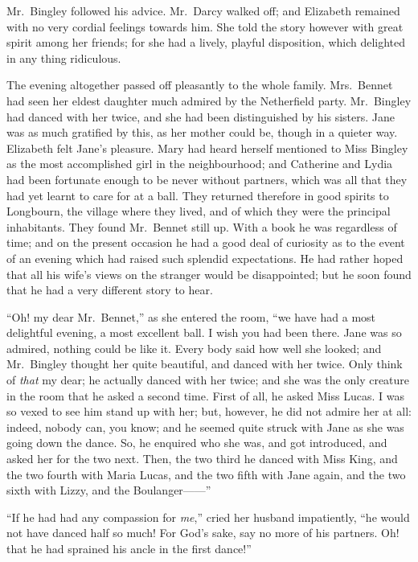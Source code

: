Mr.\ Bingley followed his advice. Mr.\ Darcy walked off;
and Elizabeth remained with no very cordial feelings
towards him. She told the story however with great
spirit among her friends; for she had a lively, playful
disposition, which delighted in any thing ridiculous.

The evening altogether passed off pleasantly to the
whole family. Mrs.\ Bennet had seen her eldest daughter
much admired by the Netherfield party. Mr.\ Bingley had
danced with her twice, and she had been distinguished
by his sisters. Jane was as much gratified by this, as
her mother could be, though in a quieter way. Elizabeth
felt Jane’s pleasure. Mary had heard herself mentioned
to Miss Bingley as the most accomplished girl in the
neighbourhood; and Catherine and Lydia had been
fortunate enough to be never without partners, which
was all that they had yet learnt to care for at a ball.
They returned therefore in good spirits to Longbourn, the
village where they lived, and of which they were the
principal inhabitants. They found Mr.\ Bennet still up.
With a book he was regardless of time; and on the present
occasion he had a good deal of curiosity as to the event
of an evening which had raised such splendid expectations.
He had rather hoped that all his wife’s views on the
stranger would be disappointed; but he soon found that
he had a very different story to hear.

“Oh! my dear Mr.\ Bennet,” as she entered the room,
“we have had a most delightful evening, a most excellent
ball. I wish you had been there. Jane was so admired,
nothing could be like it. Every body said how well she
looked; and Mr.\ Bingley thought her quite beautiful,
and danced with her twice. Only think of \textit{that} my dear;
he actually danced with her twice; and she was the only
creature in the room that he asked a second time. First
of all, he asked Miss Lucas. I was so vexed to see him
stand up with her; but, however, he did not admire her
at all: indeed, nobody can, you know; and he seemed
quite struck with Jane as she was going down the dance.
So, he enquired who she was, and got introduced, and asked
her for the two next. Then, the two third he danced with
Miss King, and the two fourth with Maria Lucas, and the
two fifth with Jane again, and the two sixth with Lizzy,
and the Boulanger------”

“If he had had any compassion for \textit{me},” cried her
husband impatiently, “he would not have danced half
so much! For God’s sake, say no more of his partners.
Oh! that he had sprained his ancle in the first dance!”

